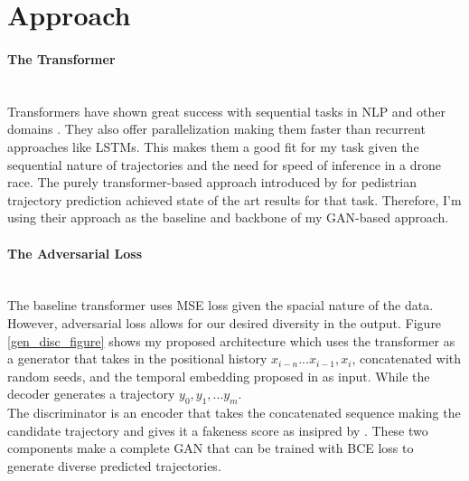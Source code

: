 \documentclass{article}
\begin{document}
\section{Approach}
\paragraph{The Transformer}$ $
\\Transformers have shown great success with sequential tasks in NLP and other domains \cite{attentionisallyouneed}. They also offer parallelization making them faster than recurrent approaches like LSTMs. This makes them a good fit for my task given the sequential nature of trajectories and the need for speed of inference in a drone race. The purely transformer-based approach introduced by \cite{giuliari2020transformer} for pedistrian trajectory prediction achieved state of the art results for that task. Therefore, I'm using their approach as the baseline and backbone of my GAN-based approach.

\paragraph{The Adversarial Loss}$ $
\\The baseline transformer uses MSE loss given the spacial nature of the data. However, adversarial loss allows for our desired diversity in the output. Figure \ref{gen_disc_figure} shows my proposed architecture which uses the transformer as a generator that takes in the positional history $x_{i-n}...x_{i-1}, x_{i}$, concatenated with random seeds, and the temporal embedding proposed in \cite{giuliari2020transformer} as input. While the decoder generates a trajectory $y_0, y_1, ... y_m$. 
\\ The discriminator is an encoder that takes the concatenated sequence making the candidate trajectory and gives it a fakeness score as insipred by \cite{fakereviewsgan}. These two components make a complete GAN that can be trained with BCE loss to generate diverse predicted trajectories.
\end{document}
